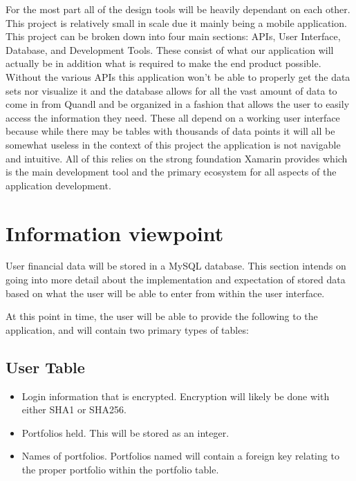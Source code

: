 \documentclass[onecolumn, draftclsnofoot,10pt, compsoc]{IEEEtran}
\begin{document}
      For the most part all of the design tools will be heavily dependant on each other. This project is relatively small in scale due it mainly being a mobile application. This project can be broken down into four main
      sections: APIs, User Interface, Database, and Development Tools. These consist of what our application will actually be in addition what is required to make the end product possible. Without the various APIs this
      application won't be able to properly get the data sets nor visualize it and the database allows for all the vast amount of data to come in from Quandl and be organized in a fashion that allows the user to easily access the
      information they need. These all depend on a working user interface because while there may be tables with thousands of data points it will all be somewhat useless in the context of this project the application is not
      navigable and intuitive. All of this relies on the strong foundation Xamarin provides which is the main development tool and the primary ecosystem for all aspects of the application development. 

\section{Information viewpoint}

        User financial data will be stored in a MySQL database. This section intends on going into more detail
        about the implementation and expectation of stored
        data based on what the user will be able to enter from within the user interface.

        At this point in time, the user will be able to provide the following to the application, and will contain two primary types of tables:

\subsection{User Table}
\begin{itemize}
    \item Login information that is encrypted. Encryption will likely be done with either SHA1 or SHA256.
    \item Portfolios held. This will be stored as an integer.
    \item Names of portfolios. Portfolios named will contain a foreign key relating to the proper portfolio within the portfolio table.
\end{itemize}
\end{document}
